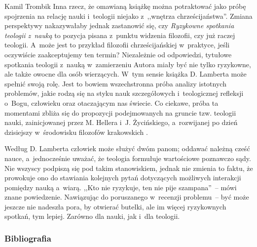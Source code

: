 \begin{recplenv}{Kamil Trombik}
Inna rzecz, że omawianą książkę można potraktować jako próbę spojrzenia na relację nauki i~teologii niejako z~,,wnętrza
chrześcijaństwa''. Zmiana perspektywy nakazywałaby jednak zastanowić się, czy \textit{Ryzykowne spotkania
teologii z~nauką} to pozycja pisana z~punktu widzenia filozofii, czy już raczej teologii. A~może jest to przykład filozofii
chrześcijańskiej w~praktyce, jeśli oczywiście zaakceptujemy ten termin? Niezależnie od odpowiedzi, tytułowe spotkania
teologii z~nauką w~zamierzeniu Autora miały być nie tylko ryzykowne, ale także owocne dla osób wierzących. W~tym sensie
książka D. Lamberta może spełnić swoją rolę. Jest to bowiem wszechstronna próba analizy istotnych problemów, jakie
rodzą się na styku nauk szczegółowych i~teologicznej refleksji o~Bogu, człowieku oraz otaczającym nas świecie. Co
ciekawe, próba ta momentami zbliża się do propozycji podejmowanych na gruncie tzw. teologii nauki, zainicjowanej przez
M. Hellera i~J. Życińskiego, a~rozwijanej po dzień dzisiejszy w~środowisku filozofów krakowskich
\parencite{polak_teologia_2015,obolevitch_problem_2012}.

Według D. Lamberta człowiek może służyć dwóm panom; oddawać należną cześć nauce, a~jednocześnie uważać, że teologia
formułuje wartościowe poznawczo sądy. Nie wszyscy podpiszą się pod takim stanowiskiem, jednak nie zmienia to faktu, że
prowokuje ono do stawiania kolejnych pytań dotyczących możliwych interakcji pomiędzy nauką a~wiarą. ,,Kto nie ryzykuje,
ten nie pije szampana''~-- mówi znane powiedzenie. Nawiązując do poruszanego w~recenzji problemu~-- być może jeszcze nie
nadeszła pora, by otwierać butelki, ale im więcej ryzykownych spotkań, tym lepiej. Zarówno dla nauki, jak i~dla
teologii. 





\subsubsection{Bibliografia}\nopagebreak[4]
\end{recplenv}


